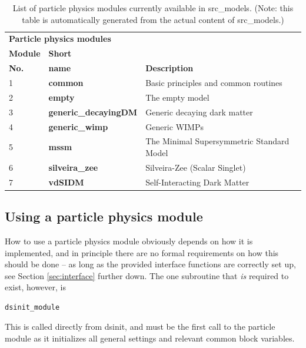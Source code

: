 \documentclass[a4paper,10pt,oneside]{book}
\newcommand{\code}[1]{\ft{#1}}
\newcommand{\ft}[1]{\textsf{#1}}
\newcommand{\ftb}[1]{{\bfseries \sffamily #1}}
\begin{document}
\begin{table}[t!]
\begin{tabular}{llp{8cm}}
\multicolumn{3}{l}{\bfseries Particle physics modules} \\
\cline{1-3}
{\bfseries Module} & {\bfseries Short} & {\bfseries } \\
{\bfseries No.} & {\bfseries name} & {\bfseries Description} \\
\hline
1 & \ftb{common} & Basic principles and common routines \\[0.5ex]
2 & \ftb{empty} & The empty model \\[0.5ex]
3 & \ftb{generic\_decayingDM} & Generic decaying dark matter \\[0.5ex]
4 & \ftb{generic\_wimp} & Generic WIMPs \\[0.5ex]
5 & \ftb{mssm} & The Minimal Supersymmetric Standard Model \\[0.5ex]
6 & \ftb{silveira\_zee} & Silveira-Zee (Scalar Singlet) \\[0.5ex]
7 & \ftb{vdSIDM} & Self-Interacting Dark Matter \\[0.5ex]
\hline
\end{tabular}
\caption{List of particle physics modules currently available in \code{src\_models}. (Note: this table is automatically generated from the actual content of \code{src\_models}.)}
\label{tab:modules}
\end{table}


\subsection{Using a particle physics module}

How to use a particle physics module obviously depends on how it is implemented,
and in principle there are no formal requirements on how this should be done -- as long as the 
provided interface functions are correctly set up, see Section \ref{sec:interface} further down.
The one subroutine that {\it is} required to exist, however, is
\begin{verbatim}
dsinit_module
\end{verbatim}
This is called directly from \code{dsinit}, and must be the first call to the particle module 
as it initializes all general settings and relevant common block variables. 
\end{document}
